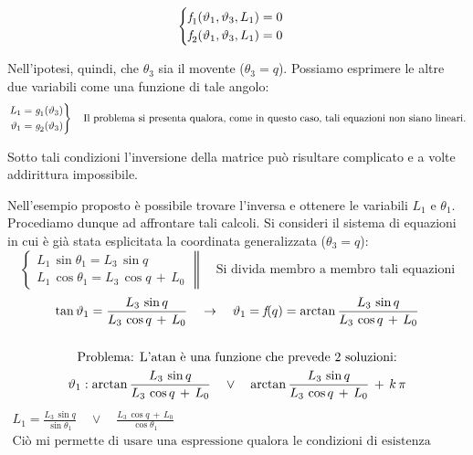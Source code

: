 			\[
			\begin{cases}
				\emph{f}_1(\theta_1, \theta_3, L_1) = 0\\
				\emph{f}_2(\theta_1, \theta_3, L_1) = 0				
			\end{cases}
			\]
			
			Nell'ipotesi, quindi, che $\theta_3$ sia il movente ($\theta_3 = q$). Possiamo esprimere le altre due variabili come una funzione di tale angolo:
			\[
			\left.
			\begin{aligned}
				L_1 &= \emph{g}_1(\theta_3)\\
				\theta_1 &= \emph{g}_2(\theta_3)
			\end{aligned}
			\right\}
			\quad
			\text{Il problema si presenta qualora, come in questo caso, tali equazioni non siano lineari.}
			\]
			
			 Sotto tali condizioni l'inversione della matrice può risultare complicato e a volte addirittura impossibile.
			 
			 Nell'esempio proposto è possibile trovare l'inversa e ottenere le variabili $L_1$ e $\theta_1$. Procediamo dunque ad affrontare tali calcoli.
			 Si consideri il sistema di equazioni in cui è già stata esplicitata la coordinata generalizzata ($\theta_3 = q$):
			 \[
			 \left.
			 \begin{cases}
			     L_1 \, \sin{\theta_1} = L_3\,\sin{q}\\
			 	L_1\,\cos{\theta_1} = L_3\,\cos{q}\,+\,L_0			 	
			 \end{cases}
			 \right\|
			 \quad
			 \text{Si divida membro a membro tali equazioni}
			\]
			\begin{gather*}
				\tan{\theta_1} = \frac{L_3\,\sin{q}}{L_3\,\cos{q}\,+\,L_0}\quad
				\rightarrow
				\quad
				\theta_1 = \emph{f}(q) = \arctan{ \frac{L_3\,\sin{q}}{L_3\,\cos{q}\,+\,L_0}}\\
				\\
				\text{Problema: L'atan è una funzione che prevede 2 soluzioni:}\\
				\theta_1 : \arctan{ \frac{L_3\,\sin{q}}{L_3\,\cos{q}\,+\,L_0}} \quad \lor \quad \arctan{ \frac{L_3\,\sin{q}}{L_3\,\cos{q}\,+\,L_0}}\,+\,k\,\pi\\
				\end{gather*}
				\begin{gather*}
				L_1 = \frac{L_3\,\sin{q}}{\sin{\theta_1}}\quad \lor \quad \frac{L_3\,\cos{q}\,+\,L_0}{\cos{\theta_1}}\\
				\text{Ciò mi permette di usare una espressione qualora le condizioni di esistenza dell'altra espressione vengano meno}
			\end{gather*}
			
